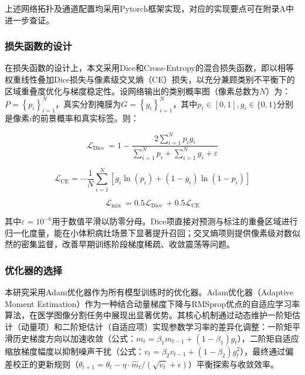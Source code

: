 上述网络拓扑及通道配置均采用Pytorch框架实现，对应的实现要点可在附录A中进一步查证。

\subsubsection{损失函数的设计}

在损失函数的设计上，本文采用Dice和Cross-Entropy的混合损失函数，即以相等权重线性叠加Dice损失与像素级交叉熵（CE）损失，以充分兼顾类别不平衡下的区域重叠度优化与梯度稳定性。设网络输出的类别概率图（像素总数为$N$）为：$ P=\left\{p_{i}\right\}_{i=1}^{N} $，真实分割掩膜为$ G=\left\{g_{i}\right\}_{i=1}^{N} $，其中$ p_{i} \in[0,1], g_{i} \in\{0,1\}$分别是像素$i$的前景概率和真实标签。则：

\begin{equation}
    \mathcal{L}_{\text {Dice }}=1-\frac{2 \sum_{i=1}^{N} p_{i} g_{i}}{\sum_{i=1}^{N} p_{i}+\sum_{i=1}^{N} g_{i}+\varepsilon}
\end{equation}

\begin{equation}
    \mathcal{L}_{\mathrm{CE}}=-\frac{1}{N} \sum_{i=1}^{N}\left[g_{i} \ln \left(p_{i}\right)+\left(1-g_{i}\right) \ln \left(1-p_{i}\right)\right]
\end{equation}

\begin{equation}
    \mathcal{L}_{\text {mix }}=0.5 \mathcal{L}_{\text {Dice }}+0.5 \mathcal{L}_{\mathrm{CE}}
\end{equation}

其中$ \varepsilon=10^{-6} $用于数值平滑以防零分母。Dice项直接对预测与标注的重叠区域进行归一化度量，能在小体积病灶场景下显著提升召回；交叉熵项则提供像素级对数似然的密集监督，改善早期训练阶段梯度稀疏、收敛震荡等问题。

\subsubsection{优化器的选择}

本研究采用Adam优化器作为所有模型训练时的优化器。Adam优化器（Adaptive Moment Estimation）作为一种结合动量梯度下降与RMSprop优点的自适应学习率算法，在医学图像分割任务中展现出显著优势。其核心机制通过动态维护一阶矩估计（动量项）和二阶矩估计（自适应项）实现参数学习率的差异化调整：一阶矩平滑历史梯度方向以加速收敛（公式：\( m_t = \beta_1 m_{t-1} + (1 - \beta_1) g_t \)），二阶矩自适应缩放梯度幅度以抑制噪声干扰（公式：\( v_t = \beta_2 v_{t-1} + (1 - \beta_2) g_t^2 \)），最终通过偏差校正的更新规则（\( \theta_{t+1} = \theta_t - \eta \cdot \hat{m}_t / (\sqrt{\hat{v}_t} + \epsilon) \)）平衡探索与收敛效率。

